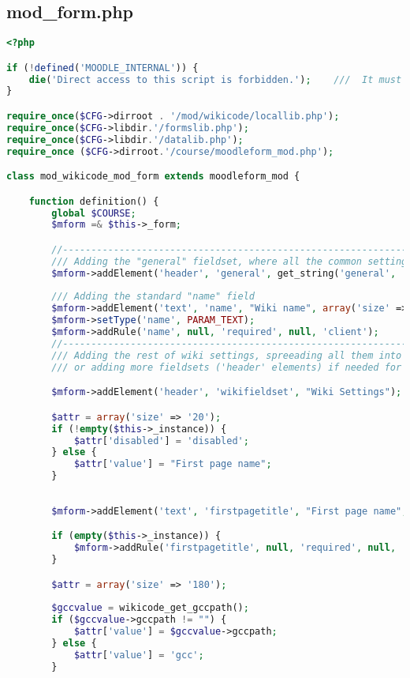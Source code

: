 \subsection{mod\_form.php}
\begin{lstlisting}[language=PHP]
<?php

if (!defined('MOODLE_INTERNAL')) {
    die('Direct access to this script is forbidden.');    ///  It must be included from a Moodle page
}

require_once($CFG->dirroot . '/mod/wikicode/locallib.php');
require_once($CFG->libdir.'/formslib.php');
require_once($CFG->libdir.'/datalib.php');
require_once ($CFG->dirroot.'/course/moodleform_mod.php');

class mod_wikicode_mod_form extends moodleform_mod {

    function definition() {
        global $COURSE;
        $mform =& $this->_form;

        //-------------------------------------------------------------------------------
        /// Adding the "general" fieldset, where all the common settings are showed
        $mform->addElement('header', 'general', get_string('general', 'form'));
		
        /// Adding the standard "name" field
        $mform->addElement('text', 'name', "Wiki name", array('size' => '64'));
        $mform->setType('name', PARAM_TEXT);
        $mform->addRule('name', null, 'required', null, 'client');
        //-------------------------------------------------------------------------------
        /// Adding the rest of wiki settings, spreeading all them into this fieldset
        /// or adding more fieldsets ('header' elements) if needed for better logic

        $mform->addElement('header', 'wikifieldset', "Wiki Settings");

        $attr = array('size' => '20');
        if (!empty($this->_instance)) {
            $attr['disabled'] = 'disabled';
        } else {
            $attr['value'] = "First page name";
        }
        
	
        $mform->addElement('text', 'firstpagetitle', "First page name", $attr);

        if (empty($this->_instance)) {
            $mform->addRule('firstpagetitle', null, 'required', null, 'client');
        }

		$attr = array('size' => '180');
		
		$gccvalue = wikicode_get_gccpath();
		if ($gccvalue->gccpath != "") {
		    $attr['value'] = $gccvalue->gccpath;
		} else {
			$attr['value'] = 'gcc';
		}
		

\end{lstlisting}

